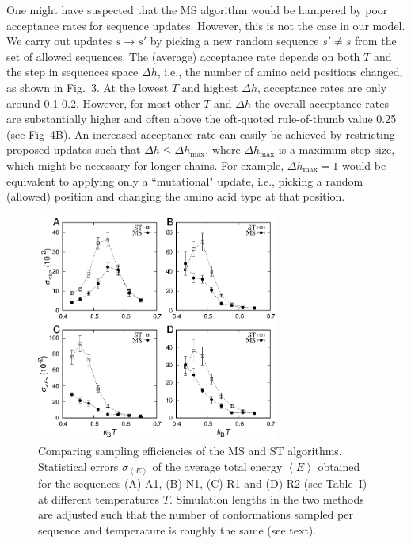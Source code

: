 \documentclass[
aip,
rsi,%
amsmath,amssymb,
reprint,%
]{revtex4-1}
\newcommand	 {\sbar}	{{s}}
\begin{document}
One might have suspected that the MS algorithm would be hampered by poor acceptance rates for sequence updates. However, this is not the case in our model. We carry out updates $\sbar\rightarrow\sbar'$ by picking a new random sequence $\sbar'\ne\sbar$ from the set of allowed sequences. The (average) acceptance rate  depends on both $T$ and the step in sequences space $\Delta h$, i.e., the number of amino acid positions changed, as shown in Fig.~3. At the lowest $T$ and highest $\Delta h$, acceptance rates are only around 0.1-0.2. However, for most other $T$ and $\Delta h$ the overall acceptance rates are substantially higher and often above the oft-quoted rule-of-thumb value 0.25~\cite{Gilks1996} (see Fig~4B). An increased acceptance rate can easily be achieved by restricting proposed updates such that $\Delta h\le\Delta h_\mathrm{max}$, where $\Delta h_\mathrm{max}$ is a maximum step size, which might be necessary for longer chains. {\color{red} For example, $\Delta h_\mathrm{max} = 1$ would be equivalent to applying only a ``mutational" update, i.e., picking a random (allowed) position and changing the amino acid type at that position.}

\begin{figure}
\includegraphics[width=8.0cm]{Fig4}
\caption{Comparing sampling efficiencies of the MS and ST algorithms. Statistical errors $\sigma_{\left < E\right >}$ of the average total energy $\left < E\right >$ obtained for the sequences (A) A1, (B) N1, (C) R1 and (D) R2 (see Table~I) at different temperatures $T$. Simulation lengths in the two methods are adjusted such that the number of conformations sampled per sequence and temperature is roughly the same (see text). }
\end{figure}
\end{document}
